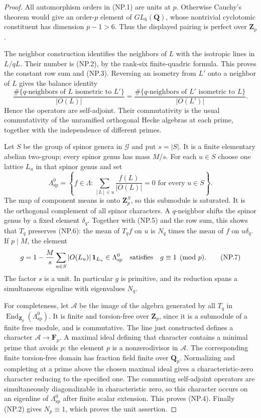 \begin{proof}
All automorphism orders in (NP.1) are units at $p$.  Otherwise Cauchy's
theorem would give an order-$p$ element of $GL_6(\mathbf Q)$, whose
nontrivial cyclotomic constituent has dimension $p-1>6$.
Thus the displayed pairing is perfect over $\mathbf Z_p$.

The neighbor construction identifies the neighbors of $L$ with the
isotropic lines in $L/qL$.  Their number is (NP.2), by the rank-six
finite-quadric formula.  This proves the constant row sum and (NP.3).
Reversing an isometry from $L'$ onto a neighbor of $L$ gives the balance
identity
\[
 \frac{\#\{q\text{-neighbors of }L\text{ isometric to }L'\}}{|O(L)|}
 =\frac{\#\{q\text{-neighbors of }L'\text{ isometric to }L\}}{|O(L')|}.
 \tag{NP.5}
\]
Hence the operators are self-adjoint.  Their commutativity is the usual
commutativity of the unramified orthogonal Hecke algebras at each prime,
together with the independence of different primes.

Let $S$ be the group of spinor genera in $\mathcal G$ and put $s=|S|$.
It is a finite elementary abelian two-group; every spinor genus has
mass $M/s$.  For each $u\in S$ choose one lattice $L_u$ in that spinor
genus and set
\[
 \Lambda^0_{\mathrm{sp}}
  =\left\{f\in\Lambda:\sum_{[L]\in u}\frac{f(L)}{|O(L)|}=0
                       \text{ for every }u\in S\right\}.
 \tag{NP.6}
\]
The map of component means is onto $\mathbf Z_p^S$, so this submodule
is saturated.  It is the orthogonal complement of all spinor characters.
A $q$-neighbor shifts the spinor genus by a fixed element $\delta_q$.
Together with (NP.5) and the row sum, this shows that $T_q$ preserves
(NP.6): the mean of $T_qf$ on $u$ is $N_q$ times the mean of $f$ on
$u\delta_q$.  If $p\mid M$, the element
\[
 g=1-\frac Ms\sum_{u\in S}|O(L_u)|\,\mathbf1_{L_u}
       \in\Lambda^0_{\mathrm{sp}}
       \quad\hbox{satisfies}\quad g\equiv1\pmod p.
 \tag{NP.7}
\]
The factor $s$ is a unit.  In particular $g$ is primitive, and its
reduction spans a simultaneous eigenline with eigenvalues $N_q$.

For completeness, let $\mathcal A$ be the image of the algebra generated
by all $T_q$ in $\operatorname{End}_{\mathbf Z_p}(\Lambda^0_{\mathrm{sp}})$.
It is finite and torsion-free over $\mathbf Z_p$, since it is a
submodule of a finite free module, and is commutative.  The line just
constructed defines a character $\mathcal A\to\mathbf F_p$.
A maximal ideal defining that character contains a minimal prime that
avoids $p$: the element $p$ is a nonzerodivisor in $\mathcal A$.
The corresponding finite torsion-free domain has fraction field finite
over $\mathbf Q_p$.  Normalizing and completing at a prime above the
chosen maximal ideal gives a characteristic-zero character reducing to
the specified one.  The commuting self-adjoint operators are
simultaneously diagonalizable in characteristic zero, so this character
occurs on an eigenline of $\Lambda^0_{\mathrm{sp}}$ after finite scalar
extension.  This proves (NP.4).  Finally (NP.2) gives $N_p\equiv1$,
which proves the unit assertion.
\end{proof}

